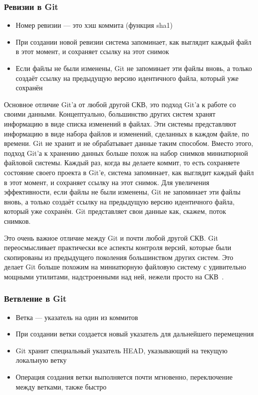 \documentclass{../industrial-development}
\begin{document}
\begin{frame} \frametitle{Ревизии в Git}
  
  \begin{itemize}
  \item Номер ревизии --- это хэш коммита (функция sha1)
  \item При создании новой ревизии система запоминает, как выглядит каждый файл в этот момент, и сохраняет ссылку на этот снимок
  \item Если файлы не были изменены, Git не запоминает эти файлы вновь, а только создаёт ссылку на предыдущую версию идентичного файла, который уже сохранён
  \end{itemize}
\end{frame}

\lecturenotes

Основное отличие Git’а от любой другой СКВ, это подход Git’а к работе со своими данными. Концептуально, большинство других систем хранят информацию в виде списка изменений в файлах. Эти системы представляют информацию в виде набора файлов и изменений, сделанных в каждом файле, по времени. 
Git не хранит и не обрабатывает данные таким способом. Вместо этого, подход Git’а к хранению данных больше похож на набор снимков миниатюрной файловой системы. Каждый раз, когда вы делаете коммит, то есть сохраняете состояние своего проекта в Git’е, система запоминает, как выглядит каждый файл в этот момент, и сохраняет ссылку на этот снимок. Для увеличения эффективности, если файлы не были изменены, Git не запоминает эти файлы вновь, а только создаёт ссылку на предыдущую версию идентичного файла, который уже сохранён. Git представляет свои данные как, скажем, поток снимков.

Это очень важное отличие между Git и почти любой другой СКВ. Git переосмысливает практически все аспекты контроля версий, которые были скопированы из предыдущего поколения большинством других систем. Это делает Git больше похожим на миниатюрную файловую систему с удивительно мощными утилитами, надстроенными над ней, нежели просто на СКВ~\cite[с.~8]{ProGit}.

\begin{frame} \frametitle{Ветвление в Git}
  
  \begin{itemize}
  \item Ветка --- указатель на один из коммитов
  \item При создании ветки создается новый указатель для дальнейшего перемещения
  \item Git хранит специальный указатель HEAD, указывающий на текущую локальную ветку
  \item Операция создания ветки выполняется почти мгновенно, переключение между ветками, также быстро
  \end{itemize}
\end{frame}
\end{document}
